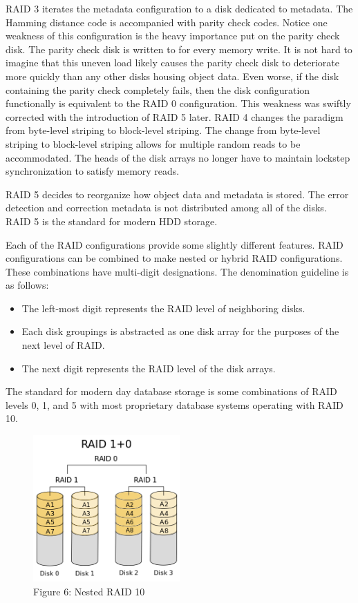 \documentclass[letterpaper, 10 pt, conference]{ieeeconf}
\begin{document}
RAID 3 iterates the metadata configuration to a disk dedicated to metadata.  The Hamming distance code is accompanied with parity check codes.  Notice one weakness of this configuration is the heavy importance put on the parity check disk.  The parity check disk is written to for every memory write.  It is not hard to imagine that this uneven load likely causes the parity check disk to deteriorate more quickly than any other disks housing object data.  Even worse, if the disk containing the parity check completely fails, then the disk configuration functionally is equivalent to the RAID 0 configuration.  This weakness was swiftly corrected with the introduction of RAID 5 later.  RAID 4 changes the paradigm from byte-level striping to block-level striping.  The change from byte-level striping to block-level striping allows for multiple random reads to be accommodated.  The heads of the disk arrays no longer have to maintain lockstep synchronization to satisfy memory reads.

RAID 5 decides to reorganize how object data and metadata is stored.  The error detection and correction metadata is not distributed among all of the disks.  RAID 5 is the standard for modern HDD storage.

Each of the RAID configurations provide some slightly different features.  RAID configurations can be combined to make nested or hybrid RAID configurations.  These combinations have multi-digit designations.  The denomination guideline is as follows:

\begin{itemize}
    \item The left-most digit represents the RAID level of neighboring disks.
    \item Each disk groupings is abstracted as one disk array for the purposes of the next level of RAID.
    \item The next digit represents the RAID level of the disk arrays.
\end{itemize}

The standard for modern day database storage is some combinations of RAID levels 0, 1, and 5 with most proprietary database systems operating with RAID 10.


\begin{figure}[H] %
	\centering
	\includegraphics [width=0.5\textwidth] {Figures/Nested RAID 10.png} 
    \caption{Figure 6: Nested RAID 10 \cite{14}}
\end{figure}
\end{document}
